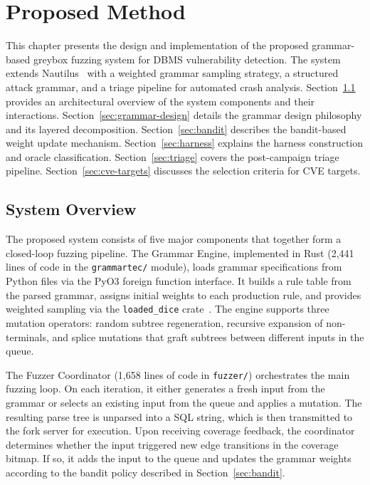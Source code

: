 \chapter{Proposed Method}
\label{chap:method}

This chapter presents the design and implementation of the proposed grammar-based greybox fuzzing system for DBMS vulnerability detection. The system extends Nautilus~\cite{nautilus} with a weighted grammar sampling strategy, a structured attack grammar, and a triage pipeline for automated crash analysis. Section~\ref{sec:overview} provides an architectural overview of the system components and their interactions. Section~\ref{sec:grammar-design} details the grammar design philosophy and its layered decomposition. Section~\ref{sec:bandit} describes the bandit-based weight update mechanism. Section~\ref{sec:harness} explains the harness construction and oracle classification. Section~\ref{sec:triage} covers the post-campaign triage pipeline. Section~\ref{sec:cve-targets} discusses the selection criteria for CVE targets.

\section{System Overview}
\label{sec:overview}

The proposed system consists of five major components that together form a closed-loop fuzzing pipeline. The Grammar Engine, implemented in Rust (2,441 lines of code in the \texttt{grammartec/} module), loads grammar specifications from Python files via the PyO3 foreign function interface. It builds a rule table from the parsed grammar, assigns initial weights to each production rule, and provides weighted sampling via the \texttt{loaded\_dice} crate~\cite{loadeddice}. The engine supports three mutation operators: random subtree regeneration, recursive expansion of non-terminals, and splice mutations that graft subtrees between different inputs in the queue.

The Fuzzer Coordinator (1,658 lines of code in \texttt{fuzzer/}) orchestrates the main fuzzing loop. On each iteration, it either generates a fresh input from the grammar or selects an existing input from the queue and applies a mutation. The resulting parse tree is unparsed into a SQL string, which is then transmitted to the fork server for execution. Upon receiving coverage feedback, the coordinator determines whether the input triggered new edge transitions in the coverage bitmap. If so, it adds the input to the queue and updates the grammar weights according to the bandit policy described in Section~\ref{sec:bandit}.

